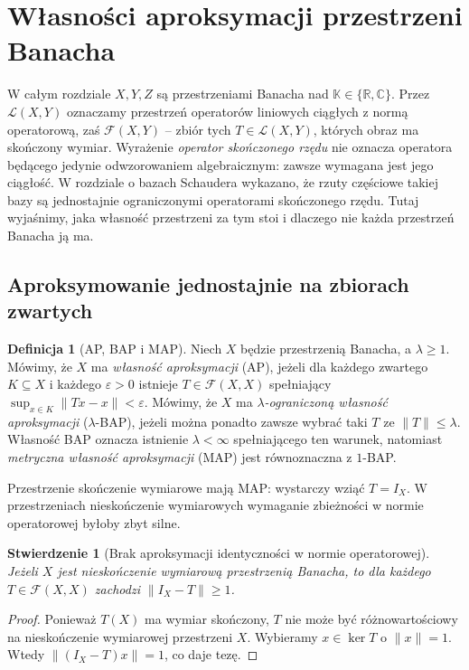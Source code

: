\documentclass[11pt,a4paper]{article}
\numberwithin{equation}{section}
\theoremstyle{plain}
\newtheorem{stwierdzenie}[twierdzenie]{Stwierdzenie}
\theoremstyle{definition}
\newtheorem{definicja}[twierdzenie]{Definicja}
\theoremstyle{remark}
\newcommand{\R}{\mathbb R}
\newcommand{\C}{\mathbb C}
\newcommand{\K}{\mathbb K}
\begin{document}
\section{Własności aproksymacji przestrzeni Banacha}
\label{sec:aproksymacja28}

W całym rozdziale $X,Y,Z$ są przestrzeniami Banacha nad
$\K\in\{\R,\C\}$. Przez $\mathcal L(X,Y)$ oznaczamy
przestrzeń operatorów liniowych ciągłych z normą operatorową, zaś
$\mathcal F(X,Y)$ -- zbiór tych $T\in\mathcal L(X,Y)$, których
obraz ma skończony wymiar. Wyrażenie \emph{operator skończonego rzędu}
nie oznacza operatora będącego jedynie odwzorowaniem algebraicznym:
zawsze wymagana jest jego ciągłość. W rozdziale o bazach Schaudera
wykazano, że rzuty częściowe takiej bazy są jednostajnie ograniczonymi
operatorami skończonego rzędu. Tutaj wyjaśnimy, jaka własność
przestrzeni za tym stoi i dlaczego nie każda przestrzeń Banacha ją ma.

\subsection{Aproksymowanie jednostajnie na zbiorach zwartych}

\begin{definicja}[AP, BAP i MAP]
\label{def:ap-bap-map28}
Niech $X$ będzie przestrzenią Banacha, a $\lambda\ge1$.
Mówimy, że $X$ ma \emph{własność aproksymacji} (AP), jeżeli dla
każdego zwartego $K\subseteq X$ i każdego $\varepsilon>0$
istnieje $T\in\mathcal F(X,X)$ spełniający
$\sup_{x\in K}\|Tx-x\|<\varepsilon$.
Mówimy, że $X$ ma \emph{$\lambda$-ograniczoną własność aproksymacji}
($\lambda$-BAP), jeżeli można ponadto zawsze wybrać taki $T$
ze $\|T\|\le\lambda$. Własność BAP oznacza istnienie
$\lambda<\infty$ spełniającego ten warunek, natomiast
\emph{metryczna własność aproksymacji} (MAP) jest równoznaczna
z $1$-BAP.
\end{definicja}

Przestrzenie skończenie wymiarowe mają MAP: wystarczy wziąć
$T=I_X$. W przestrzeniach nieskończenie wymiarowych wymaganie
zbieżności w normie operatorowej byłoby zbyt silne.

\begin{stwierdzenie}[Brak aproksymacji identyczności w normie operatorowej]
\label{prop:no-norm-identity28}
Jeżeli $X$ jest nieskończenie wymiarową przestrzenią Banacha,
to dla każdego $T\in\mathcal F(X,X)$ zachodzi
$\|I_X-T\|\ge1$.
\end{stwierdzenie}
\begin{proof}
Ponieważ $T(X)$ ma wymiar skończony, $T$ nie może być
różnowartościowy na nieskończenie wymiarowej przestrzeni $X$.
Wybieramy $x\in\ker T$ o $\|x\|=1$. Wtedy
$\|(I_X-T)x\|=1$, co daje tezę.
\end{proof}
\end{document}
